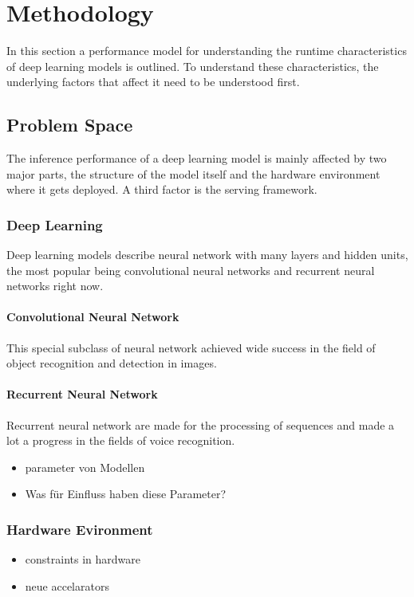 \chapter{Methodology}
In this section a performance model for understanding the runtime characteristics of deep learning models is outlined. To understand these characteristics, the underlying factors that affect it need to be understood first. 
\section{Problem Space}
The inference performance of a deep learning model is mainly affected by two major parts, the structure of the model itself and the hardware environment where it gets deployed. A third factor is the serving framework.

\subsection{Deep Learning}
Deep learning models describe neural network with many layers and hidden units, the most popular being convolutional neural networks and recurrent neural networks right now. %
\subsubsection{Convolutional Neural Network}
This special subclass of neural network achieved wide success in the field of object recognition and detection in images. 
\subsubsection{Recurrent Neural Network}
Recurrent neural network are made for the processing of sequences and made a lot a progress in the fields of voice recognition.


\begin{itemize}
    \item parameter von Modellen
    \item Was für Einfluss haben diese Parameter?
\end{itemize}
\subsection{Hardware Evironment}
\begin{itemize}
    \item constraints in hardware
    \item neue accelarators
    
\end{itemize}
